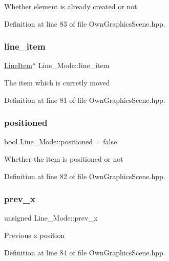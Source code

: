 Whether element is already created or not 

Definition at line 83 of file Own\+Graphics\+Scene.\+hpp.

\mbox{\label{structLine__Mode_a4e11b31f28505579f3dfcde54b27ecac}} 
\subsubsection{\texorpdfstring{line\+\_\+item}{line\_item}}
{\footnotesize\ttfamily \mbox{\hyperlink{classLineItem}{Line\+Item}}$\ast$ Line\+\_\+\+Mode\+::line\+\_\+item}

The item which is curretly moved 

Definition at line 81 of file Own\+Graphics\+Scene.\+hpp.

\mbox{\label{structLine__Mode_aefbb8555f406d47d742491003a6afde1}} 
\subsubsection{\texorpdfstring{positioned}{positioned}}
{\footnotesize\ttfamily bool Line\+\_\+\+Mode\+::positioned = false}

Whether the item is positioned or not 

Definition at line 82 of file Own\+Graphics\+Scene.\+hpp.

\mbox{\label{structLine__Mode_a8bbcbaff29a7810e066e99174e562371}} 
\subsubsection{\texorpdfstring{prev\+\_\+x}{prev\_x}}
{\footnotesize\ttfamily unsigned Line\+\_\+\+Mode\+::prev\+\_\+x}

Previous x position 

Definition at line 84 of file Own\+Graphics\+Scene.\+hpp.

\mbox{\label{structLine__Mode_a8d5fb940f686955ead3f368a8d3b9016}} 
